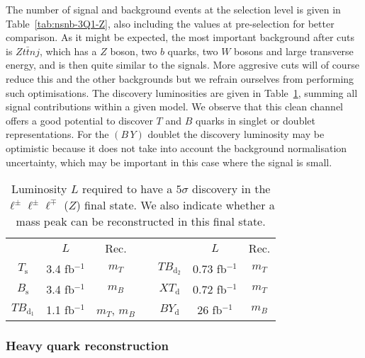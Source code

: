 \documentclass[12pt,a4paper]{article}
\newcommand{\fbin}{fb$^{-1}$}
\newcommand{\Ts}{T_\text{s}}
\newcommand{\Bs}{B_\text{s}}
\newcommand{\TBd}{TB_{\text{d}_1}}
\newcommand{\TBD}{TB_{\text{d}_2}}
\newcommand{\XTd}{XT_\text{d}}
\newcommand{\BYd}{BY_\text{d}}
\newcommand{\BY}{(B \, Y)}
\begin{document}
The number of signal and background events at the selection level is given in Table~\ref{tab:nsnb-3Q1-Z}, also including the values at pre-selection for better comparison.
As it might be expected, the most important background after cuts is $Z t \bar t nj$, which has a $Z$ boson, two $b$ quarks, two $W$ bosons and large transverse energy, and is then quite similar to the signals. More aggresive cuts will of course reduce this and the other backgrounds but we refrain ourselves from performing such optimisations. The discovery luminosities are given in Table~\ref{tab:sig-3Q1-Z}, summing all signal contributions within a given model. We observe that this clean channel offers a good potential to discover $T$ and $B$ quarks in singlet or doublet representations. For the $\BY$ doublet the discovery luminosity may be optimistic because it does not take into account the background normalisation uncertainty, which may be important in this case where the signal is small. 

\begin{table}[ht]
\begin{center}
\begin{tabular}{ccccccc}
       & $L$      & Rec. & \quad &        & $L$       & Rec. \\[1mm]
$\Ts$  & 3.4 \fbin  & $m_T$   &       & $\TBD$ & 0.73 \fbin & $m_T$ \\
$\Bs$  & 3.4 \fbin & $m_B$   &       & $\XTd$ & 0.72 \fbin & $m_T$ \\
$\TBd$ & 1.1 \fbin & $m_T$, $m_B$    &       & $\BYd$ & 26 \fbin    & $m_B$
\end{tabular}
\end{center}
\caption{Luminosity $L$ required to have a $5\sigma$ discovery in the $\ell^\pm \ell^\pm \ell^\mp$ ($Z$) final state.
We also indicate whether a mass peak can be reconstructed in this final state.}
\label{tab:sig-3Q1-Z}
\end{table}


\subsubsection{Heavy quark reconstruction}
\label{sec:3l-Z-2}
\end{document}
